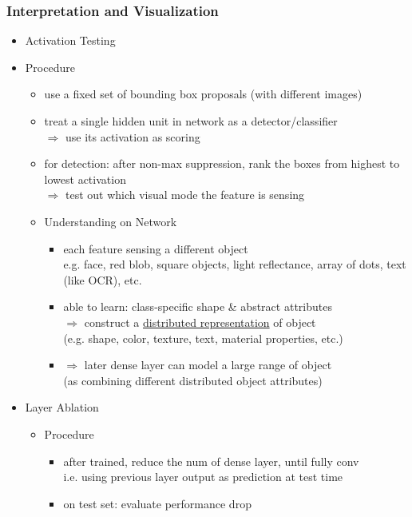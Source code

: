 \subsubsection{Interpretation and Visualization}
\begin{itemize}
\item Activation Testing
	\item Procedure
		\begin{itemize}
		\item use a fixed set of bounding box proposals (with different images)
		\item treat a single hidden unit in network as a detector/classifier \\
		$\Rightarrow$ use its activation as scoring
		\item for detection: after non-max suppression, rank the boxes from highest to lowest activation \\
		$\Rightarrow$ test out which visual mode the feature is sensing
	\item Understanding on Network
		\begin{itemize}
		\item each feature sensing a different object \\
		e.g. face, red blob, square objects, light reflectance, array of dots, text (like OCR), etc.
		\item able to learn: class-specific shape \& abstract attributes \\
		$\Rightarrow$ construct a \underline{distributed representation} of object \\ 
		(e.g. shape, color, texture, text, material properties, etc.)
		\item $\Rightarrow$ later dense layer can model a large range of object \\
		(as combining different distributed object attributes)
		\end{itemize}
	\end{itemize}
\item Layer Ablation
	\begin{itemize}
	\item Procedure
		\begin{itemize}
		\item after trained, reduce the num of dense layer, until fully conv \\
		i.e. using previous layer output as prediction at test time
		\item on test set: evaluate performance drop \\

\end{itemize}
\end{itemize}
\end{itemize}
